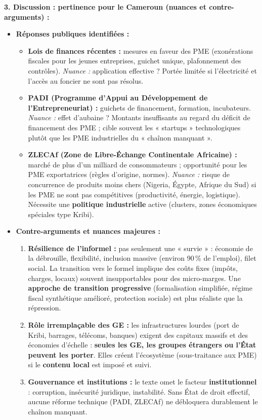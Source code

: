 \documentclass[11pt]{article}
\begin{document}
\begin{corrige}
\textbf{3. Discussion : pertinence pour le Cameroun (nuances et contre-arguments) :}
\begin{itemize}
    \item \textbf{Réponses publiques identifiées :}
    \begin{itemize}
        \item \textbf{Lois de finances récentes :} mesures en faveur des PME (exonérations fiscales pour les jeunes entreprises, guichet unique, plafonnement des contrôles). \emph{Nuance :} application effective ? Portée limitée si l'électricité et l'accès au foncier ne sont pas résolus.
        \item \textbf{PADI (Programme d'Appui au Développement de l'Entrepreneuriat) :} guichets de financement, formation, incubateurs. \emph{Nuance :} effet d'aubaine ? Montants insuffisants au regard du déficit de financement des PME ; cible souvent les « startups » technologiques plutôt que les PME industrielles du « chaînon manquant ».
        \item \textbf{ZLECAf (Zone de Libre-Échange Continentale Africaine) :} marché de plus d'un milliard de consommateurs ; opportunité pour les PME exportatrices (règles d'origine, normes). \emph{Nuance :} risque de concurrence de produits moins chers (Nigeria, Égypte, Afrique du Sud) si les PME ne sont pas compétitives (productivité, énergie, logistique). Nécessite une \textbf{politique industrielle} active (clusters, zones économiques spéciales type Kribi).
    \end{itemize}
    \item \textbf{Contre-arguments et nuances majeures :}
    \begin{enumerate}
        \item \textbf{Résilience de l'informel :} pas seulement une « survie » : économie de la débrouille, flexibilité, inclusion massive (environ 90\,\% de l'emploi), filet social. La transition vers le formel implique des coûts fixes (impôts, charges, locaux) souvent insupportables pour des micro-marges. Une \textbf{approche de transition progressive} (formalisation simplifiée, régime fiscal synthétique amélioré, protection sociale) est plus réaliste que la répression.
        \item \textbf{Rôle irremplaçable des GE :} les infrastructures lourdes (port de Kribi, barrages, télécoms, banques) exigent des capitaux massifs et des économies d'échelle : \textbf{seules les GE, les groupes étrangers ou l'État peuvent les porter}. Elles créent l'écosystème (sous-traitance aux PME) si le \textbf{contenu local} est imposé et suivi.
        \item \textbf{Gouvernance et institutions :} le texte omet le facteur \textbf{institutionnel} : corruption, insécurité juridique, instabilité. Sans État de droit effectif, aucune réforme technique (PADI, ZLECAf) ne débloquera durablement le chaînon manquant.
    \end{enumerate}
\end{itemize}
\end{corrige}
\end{document}
